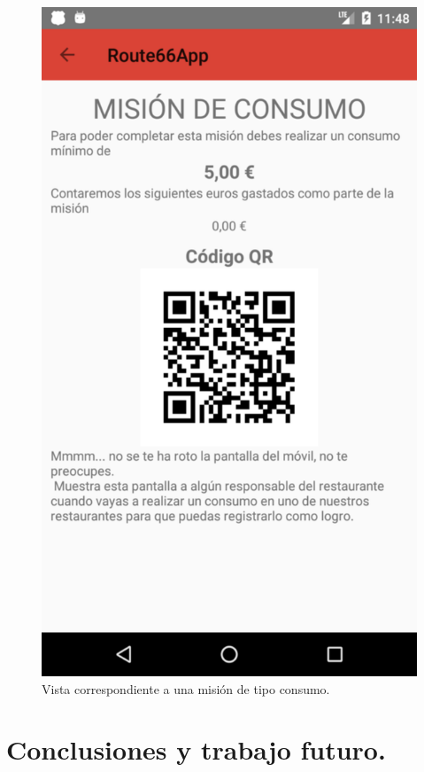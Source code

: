 \documentclass[twoside]{report}
\begin{document}
\begin{figure}[H]
\begin{center}
\includegraphics[scale=0.25]{images/userguide/31.png}
\caption{Vista correspondiente a una misión de tipo consumo.}
\end{center}
\end{figure}



\chapter{Conclusiones y trabajo futuro.}
\end{document}
